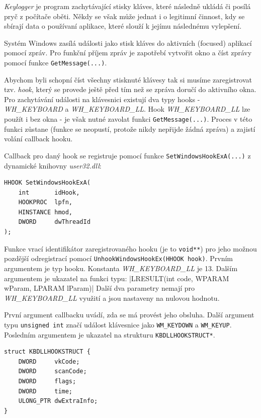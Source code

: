 \documentclass[12pt]{article}
\begin{document}


\textit{Keylogger} je program zachytávající stisky kláves, které následně ukládá či posílá pryč z počítače oběti.
Někdy se však může jednat i o legitimní činnost, kdy se sbírají data o používaní aplikace, které slouží k jejímu následnému vylepšení.


Systém Windows zasílá události jako stisk kláves do aktivních (focused) aplikací pomocí zpráv.
Pro funkční příjem zpráv je zapotřebí vytvořit okno a číst zprávy pomocí funkce \texttt{GetMessage(...)}.

Abychom byli schopní číst všechny stisknuté klávesy tak si musíme zaregistrovat tzv. \textit{hook}, který se provede ještě před tím než se zpráva doručí do aktivního okna.
Pro zachytávání události na klávesnici existují dva typy hooks - \textit{WH\_KEYBOARD} a \textit{WH\_KEYBOARD\_LL}.
Hook \textit{WH\_KEYBOARD\_LL} lze použít i bez okna - je však nutné zavolat funkci \texttt{GetMessage(...)}.
Proces v této funkci zůstane (funkce se neopustí, protože nikdy nepřijde žádná zpráva) a zajistí volání callback hooku.

Callback pro daný hook se registruje pomocí funkce \texttt{SetWindowsHookExA(...)} z dynamické knihovny \textit{user32.dll}:

\begin{verbatim}
HHOOK SetWindowsHookExA(
	int       idHook,
	HOOKPROC  lpfn,
	HINSTANCE hmod,
	DWORD     dwThreadId
);
\end{verbatim}

Funkce vrací identifikátor zaregistrovaného hooku (je to \texttt{void**}) pro jeho možnou pozdější odregistrací pomocí \texttt{UnhookWindowsHookEx(HHOOK hook)}.
Prvním argumentem je typ hooku.
Konstanta \textit{WH\_KEYBOARD\_LL} je 13.
Dalším argumentem je ukazatel na funkci typu: 
|LRESULT(int code, WPARAM wParam, LPARAM lParam)|
Další dva parametry nemají pro \textit{WH\_KEYBOARD\_LL} využití a jsou nastaveny na nulovou hodnotu.

První argument callbacku uvádí, zda se má provést jeho obsluha.
Další argument typu \texttt{unsigned int} značí událost klávesnice jako \texttt{WM_KEYDOWN} a \texttt{WM_KEYUP}.
Posledním argumentem je ukazatel na strukturu \texttt{KBDLLHOOKSTRUCT*}.
\begin{minipage}{\textwidth}
\begin{verbatim}
struct KBDLLHOOKSTRUCT {
	DWORD     vkCode;
	DWORD     scanCode;
	DWORD     flags;
	DWORD     time;
	ULONG_PTR dwExtraInfo;
}
\end{verbatim}
\end{minipage}
\end{document}
